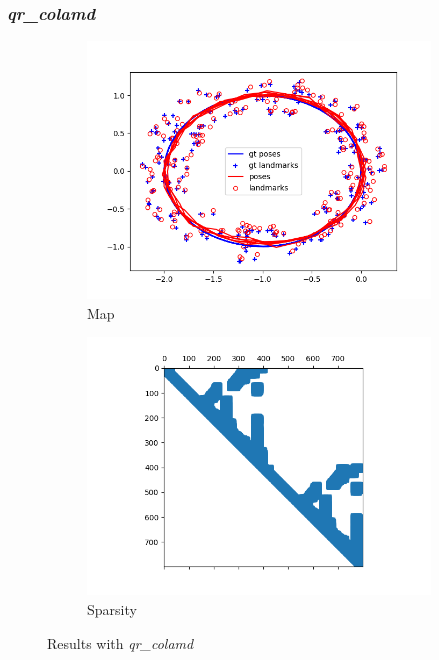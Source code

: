 \documentclass[12pt, a4paper]{article}
\begin{document}
\subsubsection{\textit{qr\_colamd}}
\begin{figure}[H]
\centering
\begin{subfigure}[b]{0.45\textwidth}
  \includegraphics[width=\textwidth]{./results/linear/qr_colamd_2d_linear_loop_map.png}
  \caption{Map}
\end{subfigure}
\hfill
\begin{subfigure}[b]{0.45\textwidth}
  \includegraphics[width=\textwidth]{./results/linear/qr_colamd_2d_linear_loop_sparsity.png}
  \caption{Sparsity}
\end{subfigure}
\caption{Results with \textit{qr\_colamd}}
\end{figure}
\end{document}
